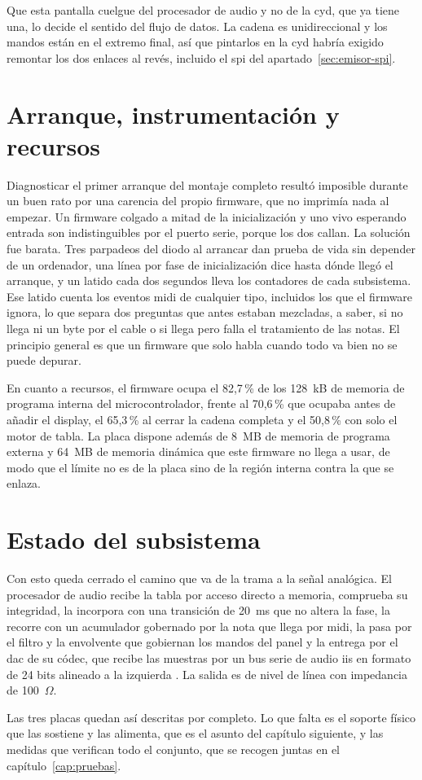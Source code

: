 Que esta pantalla cuelgue del procesador de audio y no de la \gls{cyd}, que ya
tiene una, lo decide el sentido del flujo de datos. La cadena es unidireccional
y los mandos están en el extremo final, así que pintarlos en la \gls{cyd}
habría exigido remontar los dos enlaces al revés, incluido el \gls{spi} del
apartado~\ref{sec:emisor-spi}.

\section{Arranque, instrumentación y recursos}
\label{sec:instrumentacion}

Diagnosticar el primer arranque del montaje completo resultó imposible durante
un buen rato por una carencia del propio firmware, que no imprimía nada al
empezar. Un firmware colgado a mitad de la inicialización y uno vivo esperando
entrada son indistinguibles por el puerto serie, porque los dos callan. La
solución fue barata. Tres parpadeos del diodo al arrancar dan prueba de vida sin
depender de un ordenador, una línea por fase de inicialización dice hasta dónde
llegó el arranque, y un latido cada dos segundos lleva los contadores de cada
subsistema. Ese latido cuenta los eventos \gls{midi} de cualquier tipo,
incluidos los que el firmware ignora, lo que separa dos preguntas que antes
estaban mezcladas, a saber, si no llega ni un byte por el cable o si llega pero
falla el tratamiento de las notas. El principio general es que un firmware que
solo habla cuando todo va bien no se puede depurar.

En cuanto a recursos, el firmware ocupa el 82,7\,\% de los 128~kB de memoria de
programa interna del microcontrolador, frente al 70,6\,\% que ocupaba antes de
añadir el display, el 65,3\,\% al cerrar la cadena completa y el 50,8\,\% con
solo el motor de tabla. La placa dispone además de 8~MB de memoria de programa 
externa y 64~MB de memoria dinámica
\cite{DaisySeed} que este firmware no llega a usar, de modo que el límite no es
de la placa sino de la región interna contra la que se enlaza.

\section{Estado del subsistema}

Con esto queda cerrado el camino que va de la trama a la señal analógica. El
procesador de audio recibe la tabla por acceso directo a memoria, comprueba su
integridad, la incorpora con una transición de 20~ms que no altera la fase, la
recorre con un acumulador gobernado por la nota que llega por \gls{midi}, la
pasa por el filtro y la envolvente que gobiernan los mandos del panel y la
entrega por el \gls{dac} de su códec, que recibe las muestras por un bus serie
de audio \gls{iis} en formato de 24 bits alineado a la izquierda
\cite{DaisySeed}. La salida es de nivel de línea con impedancia de 100~$\Omega$.

Las tres placas quedan así descritas por completo. Lo que falta es el soporte
físico que las sostiene y las alimenta, que es el asunto del capítulo siguiente,
y las medidas que verifican todo el conjunto, que se recogen juntas en el
capítulo~\ref{cap:pruebas}.
